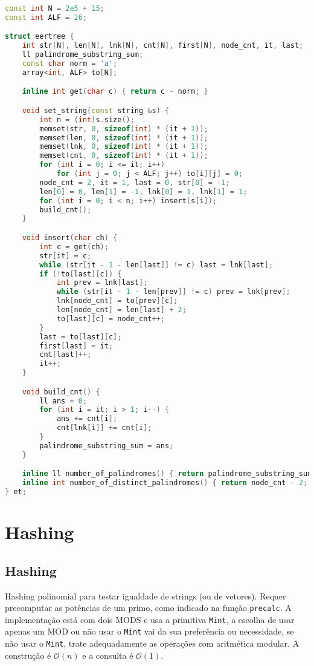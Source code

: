\documentclass[10pt, a4paper, oneside]{book}
\begin{document}
\begin{lstlisting}[language=C++]
const int N = 2e5 + 15;
const int ALF = 26;

struct eertree {
    int str[N], len[N], lnk[N], cnt[N], first[N], node_cnt, it, last;
    ll palindrome_substring_sum;
    const char norm = 'a';
    array<int, ALF> to[N];

    inline int get(char c) { return c - norm; }

    void set_string(const string &s) {
        int n = (int)s.size();
        memset(str, 0, sizeof(int) * (it + 1));
        memset(len, 0, sizeof(int) * (it + 1));
        memset(lnk, 0, sizeof(int) * (it + 1));
        memset(cnt, 0, sizeof(int) * (it + 1));
        for (int i = 0; i <= it; i++)
            for (int j = 0; j < ALF; j++) to[i][j] = 0;
        node_cnt = 2, it = 1, last = 0, str[0] = -1;
        len[0] = 0, len[1] = -1, lnk[0] = 1, lnk[1] = 1;
        for (int i = 0; i < n; i++) insert(s[i]);
        build_cnt();
    }

    void insert(char ch) {
        int c = get(ch);
        str[it] = c;
        while (str[it - 1 - len[last]] != c) last = lnk[last];
        if (!to[last][c]) {
            int prev = lnk[last];
            while (str[it - 1 - len[prev]] != c) prev = lnk[prev];
            lnk[node_cnt] = to[prev][c];
            len[node_cnt] = len[last] + 2;
            to[last][c] = node_cnt++;
        }
        last = to[last][c];
        first[last] = it;
        cnt[last]++;
        it++;
    }

    void build_cnt() {
        ll ans = 0;
        for (int i = it; i > 1; i--) {
            ans += cnt[i];
            cnt[lnk[i]] += cnt[i];
        }
        palindrome_substring_sum = ans;
    }

    inline ll number_of_palindromes() { return palindrome_substring_sum; }
    inline int number_of_distinct_palindromes() { return node_cnt - 2; }
} et;
\end{lstlisting}
\hfill

\section{Hashing}
\subsection{Hashing}


Hashing polinomial para testar igualdade de strings (ou de vetores). Requer precomputar as potências de um primo, como indicado na função \texttt{precalc}. A implementação está com dois MODS e usa a primitiva \texttt{Mint}, a escolha de usar apenas um MOD ou não usar o \texttt{Mint} vai da sua preferência ou necessidade, se não usar o \texttt{Mint}, trate adequadamente as operações com aritmética modular. A construção é $\mathcal{O}(n)$ e a consulta é $\mathcal{O}(1)$.
\end{document}
